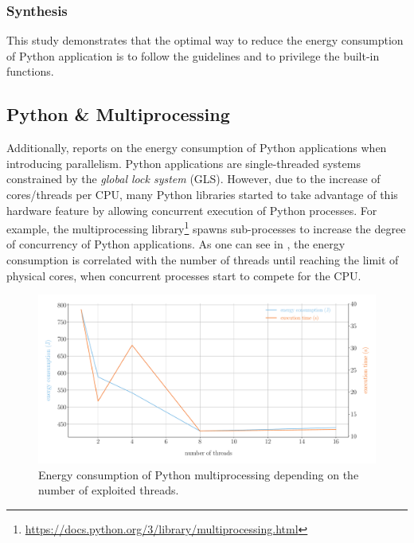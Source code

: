 \subsubsection{Synthesis}
This study demonstrates that the optimal way to reduce the energy consumption of Python application is to follow the guidelines and to privilege the built-in functions.


\subsection{Python \& Multiprocessing}


Additionally,  reports on the energy consumption of Python applications when introducing parallelism.
Python applications are single-threaded systems constrained by the \emph{global lock system} (GLS).
However, due to the increase of cores/threads per CPU, many Python libraries started to take advantage of this hardware feature by allowing concurrent execution of Python processes.
For example, the multiprocessing library\footnote{\url{https://docs.python.org/3/library/multiprocessing.html}} spawns sub-processes to increase the degree of concurrency of Python applications.
As one can see in , the energy consumption is correlated with the number of threads until reaching the limit of physical cores, when concurrent processes start to compete for the CPU.

\begin{figure}[hbt]
    \centering
    \includegraphics[width=\linewidth]{imgs/multiprocessing_energyvstime}
    \caption{Energy consumption of Python multiprocessing depending on the number of exploited threads.}
    \label{fig:python_multiprocessing}
\end{figure}

